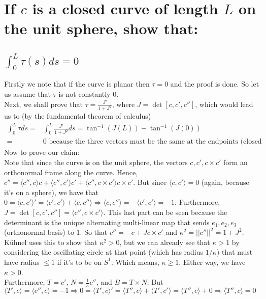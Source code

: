 \documentclass[12pt]{amsart}
\begin{document}
\newpage
\section{If $c$ is a closed curve of length $L$ on the unit sphere, show that:}
\subsection{$\int_0^L\tau(s)ds=0$}
Firstly we note that if the curve is planar then $\tau=0$ and the proof is done. So let us assume that $\tau$ is not constantly 0.
\\Next, we shall prove that $\tau=\frac{J'}{1+J^2}$, where $J=\det\left[c,c',c''\right]$, which would lead us to (by the fundamental theorem of calculus)
\begin{align*}
	\int_0^L\tau ds=&\int_0^L\frac{J'}{1+J^2}ds=\tan^{-1}(J(L))-\tan^{-1}(J(0))
	\\=&0\text{ because the three vectors must be the same at the endpoints (closed curve)}
\end{align*}
Now to prove our claim:
\\Note that since the curve is on the unit sphere, the vectors $c,c',c\times c'$ form an orthonormal frame along the curve. Hence, $c''=\langle c'',c\rangle c+\langle c'',c'\rangle c'+\langle c'',c\times c'\rangle c\times c'$. But since $\langle c,c'\rangle=0$ (again, because it's on a sphere), we have that $0=\langle c,c'\rangle'=\langle c',c'\rangle+\langle c,c''\rangle\Rightarrow\langle c,c''\rangle=-\langle c',c'\rangle=-1$. Furthermore, $J=\det[c,c',c'']=\langle c'',c\times c'\rangle$. This last part can be seen because the determinant is the unique alternating multi-linear map that sends $e_1,e_2,e_3$ (orthonormal basis) to 1. So that $c''=-c+Jc\times c'$ and $\kappa^2=||c''||^2=1+J^2$. K\"uhnel uses this to show that $\kappa^2>0$, but we can already see that $\kappa>1$ by considering the oscillating circle at that point (which has radius $1/\kappa$) that must have radius $\leq1$ if it's to be on $S^1$. Which means, $\kappa\geq1$. Either way, we have $\kappa>0$.
\\Furthermore, $T=c'$, $N=\frac{1}{\kappa}c''$, and $B=T\times N$. But $\langle T',c\rangle=\langle c'',c\rangle=-1\Rightarrow0=\langle T',c\rangle'=\langle T'',c\rangle+\langle T',c'\rangle=\langle T'',c\rangle+0\Rightarrow\langle T'',c\rangle=0$
\end{document}
